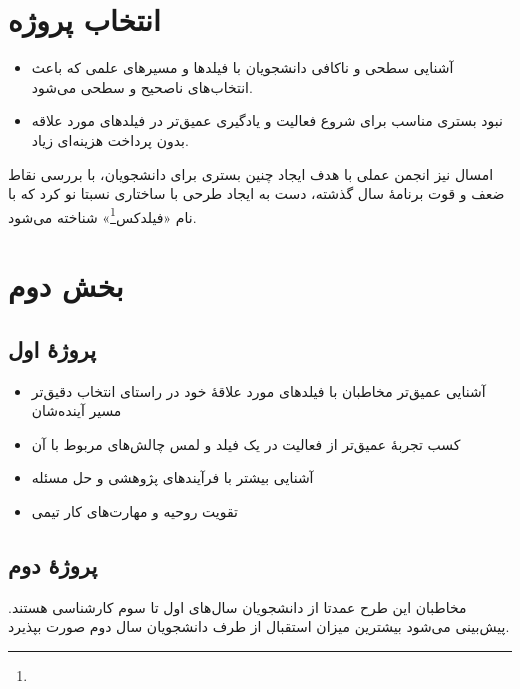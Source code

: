 \documentclass{article}
\begin{document}
\subsection{}

\subsection{}

\section{انتخاب پروژه}

\begin{itemize}
\item
آشنایی سطحی و ناکافی دانشجویان با فیلدها و مسیرهای علمی که باعث انتخاب‌های ناصحیح و سطحی می‌شود. 
\item
نبود بستری مناسب برای شروع فعالیت و یادگیری عمیق‌تر در فیلدهای مورد علاقه بدون پرداخت هزینه‌ای زیاد.
\end{itemize}
امسال نیز انجمن عملی با هدف ایجاد چنین بستری برای دانشجویان، با بررسی نقاط ضعف و قوت برنامهٔ سال گذشته، دست به ایجاد طرحی با ساختاری نسبتا نو کرد که با نام «فیلدکس\footnote{}» شناخته می‌شود.

\section{بخش دوم}
\subsection{پروژهٔ اول}
\begin{itemize}
\item
آشنایی عمیق‌تر مخاطبان با فیلدهای مورد علاقه‌ٔ خود در راستای انتخاب دقیق‌تر مسیر آینده‌شان
\item
کسب تجربه‌ٔ عمیق‌تر از فعالیت در یک فیلد و لمس چالش‌های مربوط با آن
\item
آشنایی بیشتر با فرآیندهای پژوهشی و حل مسئله
\item
تقویت روحیه‌ و مهارت‌های کار تیمی
\end{itemize}

\subsection{پروژهٔ دوم}
مخاطبان این طرح عمدتا از دانشجویان سال‌های اول تا سوم کارشناسی هستند. پیش‌بینی می‌شود بیشترین میزان استقبال از طرف دانشجویان سال دوم صورت بپذیرد.
\end{document}
